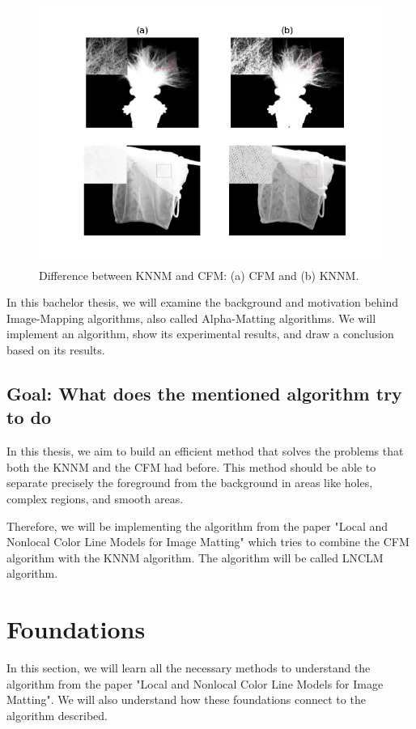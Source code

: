 \begin{figure}[t!]
	\centering
	\includegraphics[]{bilder/cfknnvergleich}
	\caption{Difference between KNNM and CFM: (a) CFM and (b) KNNM.}\label{fig_cf_knn}
\end{figure}


In this bachelor thesis, we will examine the background and motivation behind Image-Mapping algorithms, also called Alpha-Matting algorithms. We will implement an algorithm, show its experimental results, and draw a conclusion based on its results.
\subsection{Goal: What does the mentioned algorithm try to do} 

In this thesis, we aim to build an efficient method that solves the problems that both the KNNM and the CFM had before. This method should be able to separate precisely the foreground from the background in areas like holes, complex regions, and smooth areas. 

Therefore, we will be implementing the algorithm \citep{lnclm} from the paper "Local and Nonlocal Color Line Models for Image Matting" which tries to combine the CFM algorithm with the KNNM algorithm. The algorithm will be called LNCLM algorithm.


\section{Foundations}
In this section, we will learn all the necessary methods to understand the algorithm from the paper "Local and Nonlocal Color Line Models for Image Matting". We will also understand how these foundations connect to the algorithm described. 

